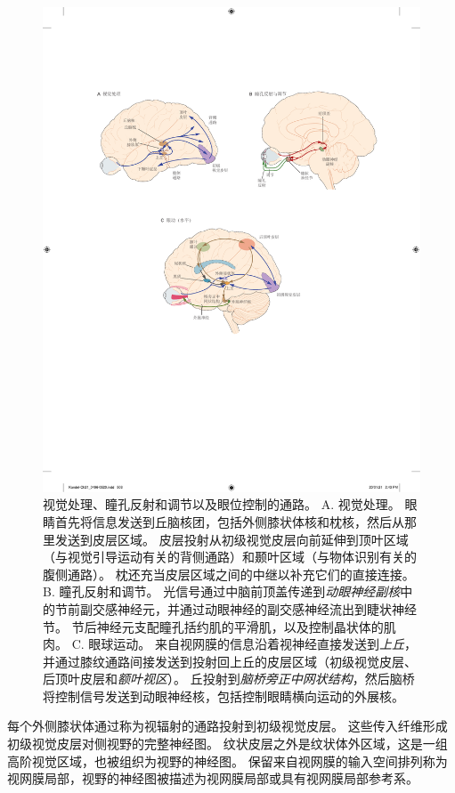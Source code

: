 \begin{figure}[htbp]
	\centering
	\includegraphics[width=1.0\linewidth]{chap21/fig_21_6}
	\caption{视觉处理、瞳孔反射和调节以及眼位控制的通路。
		A. 视觉处理。
		眼睛首先将信息发送到丘脑核团，包括外侧膝状体核和枕核，然后从那里发送到皮层区域。
		皮层投射从初级视觉皮层向前延伸到顶叶区域（与视觉引导运动有关的背侧通路）和颞叶区域（与物体识别有关的腹侧通路）。
		枕还充当皮层区域之间的中继以补充它们的直接连接。
		B. 瞳孔反射和调节。
		光信号通过中脑前顶盖传递到\textit{动眼神经副核}中的节前副交感神经元，并通过动眼神经的副交感神经流出到睫状神经节。
		节后神经元支配瞳孔括约肌的平滑肌，以及控制晶状体的肌肉。
		C. 眼球运动。
		来自视网膜的信息沿着视神经直接发送到\textit{上丘}，并通过膝纹通路间接发送到投射回上丘的皮层区域（初级视觉皮层、后顶叶皮层和\textit{额叶视区}）。
		丘投射到\textit{脑桥旁正中网状结构}，然后脑桥将控制信号发送到动眼神经核，包括控制眼睛横向运动的外展核。}
	\label{fig:21_6}
\end{figure}


每个外侧膝状体通过称为视辐射的通路投射到初级视觉皮层。
这些传入纤维形成初级视觉皮层对侧视野的完整神经图。 
纹状皮层之外是纹状体外区域，这是一组高阶视觉区域，也被组织为视野的神经图。
保留来自视网膜的输入空间排列称为视网膜局部，视野的神经图被描述为视网膜局部或具有视网膜局部参考系。


